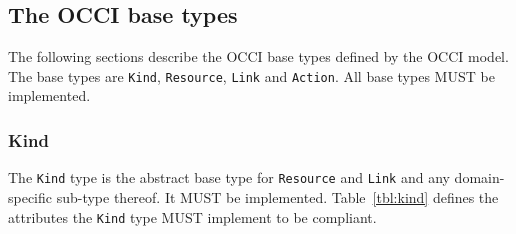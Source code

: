 \documentclass[10pt,a4paper,british]{article}
\newcommand{\hl}{\texttt}
\begin{document}

\subsection{The OCCI base types}
\label{sec:base_types}
The following sections describe the OCCI base types defined by the OCCI model.
The base types are \hl{Kind}, \hl{Resource}, \hl{Link} and \hl{Action}. All
base types MUST be implemented.

\subsubsection{Kind}
\label{sec:kind}
The \hl{Kind} type is the abstract base type for \hl{Resource} and \hl{Link}
and any domain-specific sub-type thereof. It MUST be implemented.
%
Table~\ref{tbl:kind} defines the attributes the \hl{Kind} type MUST implement to
be compliant.
\end{document}

